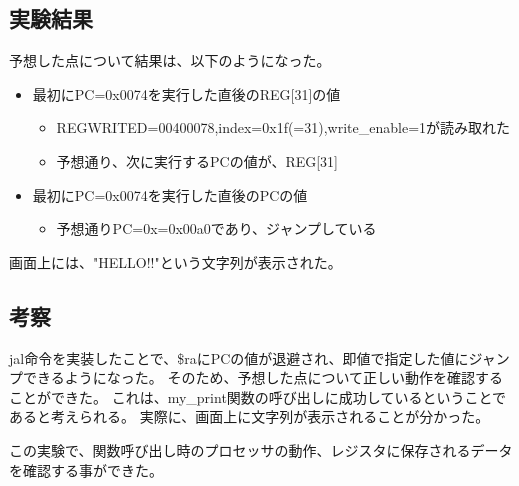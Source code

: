 \subsection{実験結果}
予想した点について結果は、以下のようになった。
\begin{itemize}
  \item 最初にPC=0x0074を実行した直後のREG[31]の値
        \begin{itemize}
          \item REGWRITED=00400078,index=0x1f(=31),write\_enable=1が読み取れた
          \item 予想通り、次に実行するPCの値が、REG[31]
        \end{itemize}
  \item 最初にPC=0x0074を実行した直後のPCの値
        \begin{itemize}
          \item 予想通りPC=0x=0x00a0であり、ジャンプしている
        \end{itemize}
\end{itemize}

画面上には、"HELLO!!"という文字列が表示された。

\subsection{考察}
jal命令を実装したことで、\$raにPCの値が退避され、即値で指定した値にジャンプできるようになった。
そのため、予想した点について正しい動作を確認することができた。
これは、my\_print関数の呼び出しに成功しているということであると考えられる。
実際に、画面上に文字列が表示されることが分かった。

この実験で、関数呼び出し時のプロセッサの動作、レジスタに保存されるデータを確認する事ができた。
